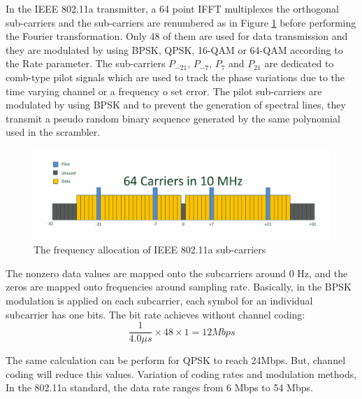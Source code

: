 In the IEEE 802.11a transmitter, a 64 point IFFT multiplexes the orthogonal sub-carriers and the sub-carriers are renumbered as in Figure \ref{fig:freq_alloc} before performing the Fourier transformation. Only 48 of them are used for data transmission and they are modulated by using BPSK, QPSK, 16-QAM or 64-QAM according to the Rate parameter. The sub-carriers $P_{-21}$, $P_{-7}$, $P_{7}$ and $P_{21}$ are dedicated to comb-type pilot signals which are used to track the phase variations due to the time varying channel or a frequency o set error. The pilot sub-carriers are modulated by using BPSK and to prevent the generation of spectral lines, they transmit a pseudo random binary sequence generated by the same polynomial used in the scrambler.\\

\begin{figure}[h!]
\centering
\includegraphics[width=\textwidth]{content/fig/freq_alloc.pdf}
\caption{The frequency allocation of IEEE 802.11a sub-carriers}
\label{fig:freq_alloc}
\end{figure}

The nonzero data values are mapped onto the subcarriers around 0 Hz, and the zeros are mapped onto frequencies around sampling rate.
Basically, in the BPSK modulation is applied on each subcarrier, each symbol for an individual subcarrier has one bits. The bit rate achieves without channel coding:\\

\begin{equation} \label{bitrate_achiv}
\frac{1}{4.0\mu s} \times 48 \times 1= 12Mbps
\end{equation}

The same calculation can be perform for QPSK to reach 24Mbps. But, channel coding will reduce this values. Variation of coding rates and modulation methods, In the 802.11a standard, the data rate ranges from 6 Mbps to 54 Mbps.\\

